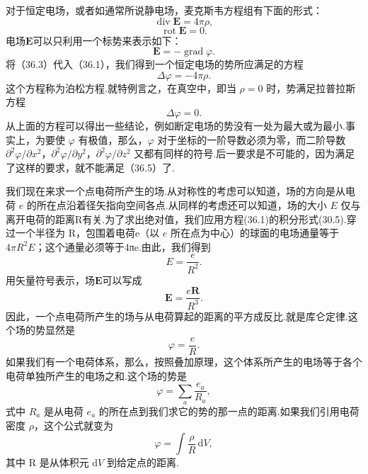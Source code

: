对于恒定电场，或者如通常所说静电场，麦克斯韦方程组有下面的形式：
\begin{equation}
  \operatorname{div}\boldsymbol{E}=4\pi\rho,
\end{equation}
\begin{equation}
  \operatorname{rot}\boldsymbol{E}=0.
\end{equation}
电场$\boldsymbol{E}$可以只利用一个标势来表示如下：
\begin{equation}
  \boldsymbol{E}=-\operatorname{grad}\varphi.
\end{equation}
将（36.3）代入（36.1），我们得到一个恒定电场的势所应满足的方程
\begin{equation}
  \Delta\varphi=-4\pi\rho.
\end{equation}
这个方程称为泊松方程.就特例言之，在真空中，即当 $\rho = 0$ 时，势满足拉普拉斯方程
\begin{equation}
  \Delta\varphi=0.
\end{equation}
从上面的方程可以得出一些结论，例如断定电场的势没有一处为最大或为最小.事实上，为要使 $\varphi$ 有极值，那么，$\varphi$ 对于坐标的一阶导数必须为零，而二阶导数 $\partial^2\varphi/\partial x^2$，$\partial^2\varphi/\partial y^2$，$\partial^2\varphi/\partial z^2$ 又都有同样的符号.后一要求是不可能的，因为满足了这样的要求，就不能满足（36.5）了.

我们现在来求一个点电荷所产生的场.从对称性的考虑可以知道，场的方向是从电荷 $e$ 的所在点沿着径矢指向空间各点.从同样的考虑还可以知道，场的大小 $E$ 仅与离开电荷的距离R有关.为了求出绝对值，我们应用方程(36.1)的积分形式(30.5).穿过一个半径为 R，包围着电荷e（以 $e$ 所在点为中心）的球面的电场通量等于 $4\pi R^2 E$；这个通量必须等于4πe.由此，我们得到
\begin{equation*}
  E=\frac{e}{R^2}.
\end{equation*}
用矢量符号表示，场$\boldsymbol{E}$可以写成
\begin{equation}
  \boldsymbol{E}=\frac{e\boldsymbol{R}}{R^3}.
\end{equation}
因此，一个点电荷所产生的场与从电荷算起的距离的平方成反比.就是库仑定律.这个场的势显然是
\begin{equation}
  \varphi=\frac{e}{R}.
\end{equation}
如果我们有一个电荷体系，那么，按照叠加原理，这个体系所产生的电场等于各个电荷单独所产生的电场之和.这个场的势是
\begin{equation*}
  \varphi=\sum_a\frac{e_a}{R_a},
\end{equation*}
式中 $R_a$ 是从电荷 $e_a$ 的所在点到我们求它的势的那一点的距离.如果我们引用电荷密度 $\rho$，这个公式就变为
\begin{equation}
  \varphi=\int\frac{\rho}{R}\,\mathrm{d}V,
\end{equation}
其中 R 是从体积元 $\mathrm{d}V$ 到给定点的距离.

